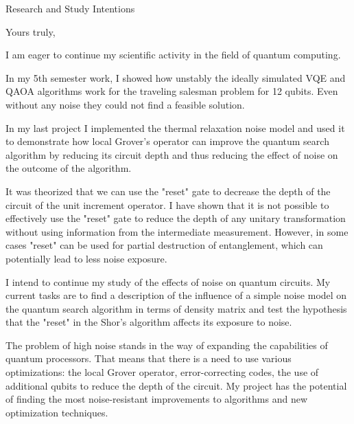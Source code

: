 \documentclass[11pt,a4paper,sans]{moderncv}        %
\begin{document}
	\clearpage
	\date{June 05, 2022}
	\opening{Research and Study Intentions}
	\closing{Yours truly,}
	\makelettertitle
	
	I am eager to continue my scientific activity in the field of quantum computing. 
	
	In my 5th semester work, I showed how unstably the ideally simulated VQE and QAOA algorithms work for the traveling salesman problem for 12 qubits. Even without any noise they could not find a feasible solution.
	
	In my last project I implemented the thermal relaxation noise model and used it to demonstrate how local Grover's operator can improve the quantum search algorithm by reducing its circuit depth and thus reducing the effect of noise on the outcome of the algorithm.
	
	It was theorized that we can use the "reset" gate to decrease the depth of the circuit of the unit increment operator. I have shown that it is not possible to effectively use the "reset" gate to reduce the depth of any unitary transformation without using information from the intermediate measurement. However, in some cases "reset" can be used for partial destruction of entanglement, which can potentially lead to less noise exposure.
	
	I intend to continue my study of the effects of noise on quantum circuits. My current tasks are to find a description of the influence of a simple noise model on the quantum search algorithm in terms of density matrix and test the hypothesis that the "reset" in the Shor's algorithm affects its exposure to noise.
	
	The problem of high noise stands in the way of expanding the capabilities of quantum processors. That means that there is a need to use various optimizations: the local Grover operator, error-correcting codes, the use of additional qubits to reduce the depth of the circuit. My project has the potential of finding the most noise-resistant improvements to algorithms and new optimization techniques.
	
\end{document}
